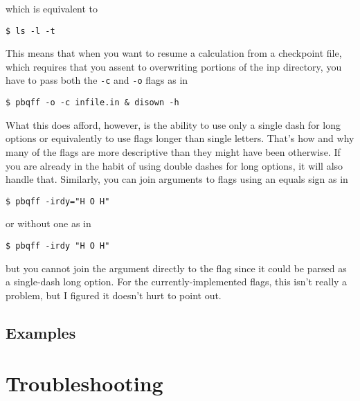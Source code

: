 \documentclass{article}
\begin{document}
\noindent
which is equivalent to 

\begin{verbatim}
$ ls -l -t
\end{verbatim}

This means that when you want to resume a calculation from a
checkpoint file, which requires that you assent to overwriting
portions of the inp directory, you have to pass both the \verb|-c| and
\verb|-o| flags as in

\begin{verbatim}
$ pbqff -o -c infile.in & disown -h
\end{verbatim}

What this does afford, however, is the ability to use only a single
dash for long options or equivalently to use flags longer than single
letters. That's how and why many of the flags are more descriptive
than they might have been otherwise. If you are already in the habit
of using double dashes for long options, it will also handle
that. Similarly, you can join arguments to flags using an equals sign
as in

\begin{verbatim}
$ pbqff -irdy="H O H"
\end{verbatim}

\noindent
or without one as in

\begin{verbatim}
$ pbqff -irdy "H O H"
\end{verbatim}

\noindent
but you cannot join the argument directly to the flag since it could
be parsed as a single-dash long option. For the currently-implemented
flags, this isn't really a problem, but I figured it doesn't hurt to
point out.

\subsection{Examples}

\section{Troubleshooting}


\end{document}
